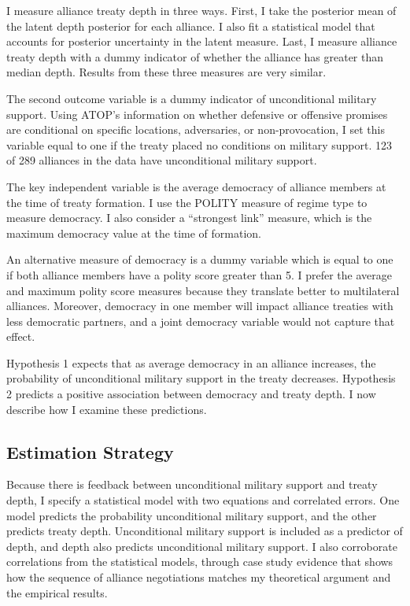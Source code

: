 \documentclass[12pt]{article}
\begin{document}
I measure alliance treaty depth in three ways.
First, I take the posterior mean of the latent depth posterior for each alliance. 
I also fit a statistical model that accounts for posterior uncertainty in the latent measure. 
Last, I measure alliance treaty depth with a dummy indicator of whether the alliance has greater than median depth. 
Results from these three measures are very similar. 


The second outcome variable is a dummy indicator of unconditional military support. 
Using ATOP's information on whether defensive or offensive promises are conditional on specific locations, adversaries, or non-provocation, I set this variable equal to one if the treaty placed no conditions on military support.
123 of 289 alliances in the data have unconditional military support. 

The key independent variable is the average democracy of alliance members at the time of treaty formation. 
I use the POLITY measure of regime type to measure democracy. 
I also consider a ``strongest link'' measure, which is the maximum democracy value at the time of formation.


An alternative measure of democracy is a dummy variable which is equal to one if both alliance members have a polity score greater than 5. 
I prefer the average and maximum polity score measures because they translate better to multilateral alliances. 
Moreover, democracy in one member will impact alliance treaties with less democratic partners, and a joint democracy variable would not capture that effect. 


Hypothesis 1 expects that as average democracy in an alliance increases, the probability of unconditional military support in the treaty decreases.
Hypothesis 2 predicts a positive association between democracy and treaty depth. 
I now describe how I examine these predictions. 


\subsection{Estimation Strategy}


Because there is feedback between unconditional military support and treaty depth, I specify a statistical model with two equations and correlated errors. 
One model predicts the probability unconditional military support, and the other predicts treaty depth.
Unconditional military support is included as a predictor of depth, and depth also predicts unconditional military support.  
I also corroborate correlations from the statistical models, through case study evidence that shows how the sequence of alliance negotiations matches my theoretical argument and the empirical results. 
\end{document}
